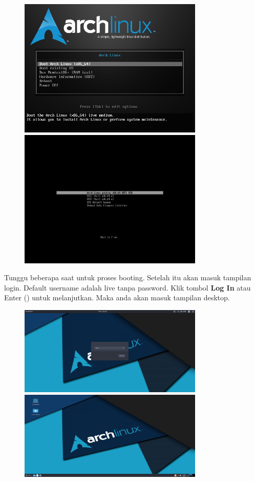 \documentclass[12pt,]{article}
\begin{document}
	\begin{figure}[!ht]
		\centering
		\includegraphics[width=250pt]{installhdd/step_1a}
		\includegraphics[width=250pt]{installhdd/step_1b}
	\end{figure}  

	Tunggu beberapa saat untuk proses booting.
	Setelah itu akan masuk tampilan login.
	Default username adalah live tanpa password.
	Klik tombol \textbf{Log In} atau Enter (\keys{\return}) untuk melanjutkan.
	Maka anda akan masuk tampilan desktop.
	
	\begin{figure}[!ht]
		\centering
		\includegraphics[width=250pt]{installhdd/step_2}
		\includegraphics[width=250pt]{installhdd/step_3}
	\end{figure} 
	
\end{document}
